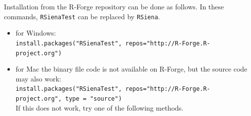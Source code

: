 \documentclass[a4paper,fleqn,11pt]{article}
\newcommand{\+}{\, + \,}
\begin{document}
\begin{enumerate}
            Installation from the R-Forge repository can be done as follows.
            In these commands, \texttt{RSienaTest} can be replaced by \texttt{RSiena}.
            \begin{itemize}
            \item for Windows:\\
            \texttt{install.packages("RSienaTest", repos="http://R-Forge.R-project.org")}
            \item for Mac the binary file code is not available on R-Forge, but the source code
            may also work:\\
            \texttt{install.packages("RSienaTest", repos="http://R-Forge.R-project.org", type = "source")}\\
            If this does not work, try one of the following methods.
            \end{itemize}


\end{enumerate}
\end{document}
